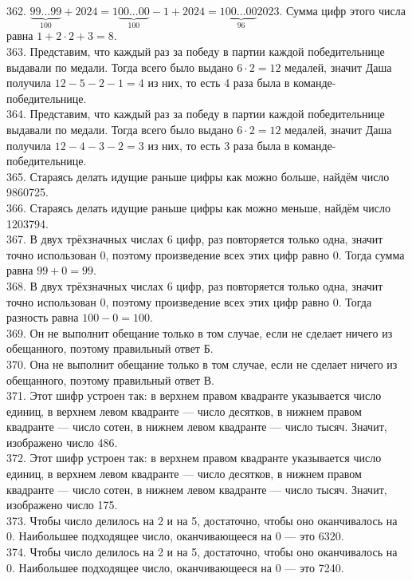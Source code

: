 362. $\underbrace{99\ldots99}_{100}+2024=1\underbrace{00\ldots00}_{100}-1+2024=1\underbrace{00\ldots00}_{96}2023.$ Сумма цифр этого числа равна $1+2\cdot2+3=8.$\\
363. Представим, что каждый раз за победу в партии каждой победительнице выдавали по медали. Тогда всего было выдано $6\cdot2=12$ медалей, значит Даша получила $12-5-2-1=4$ из них, то есть 4 раза была в команде-победительнице.\\
364. Представим, что каждый раз за победу в партии каждой победительнице выдавали по медали. Тогда всего было выдано $6\cdot2=12$ медалей, значит Даша получила $12-4-3-2=3$ из них, то есть 3 раза была в команде-победительнице.\\
365. Стараясь делать идущие раньше цифры как можно больше, найдём число 9860725.\\
366. Стараясь делать идущие раньше цифры как можно меньше, найдём число 1203794.\\
367. В двух трёхзначных числах 6 цифр, раз повторяется только одна, значит точно использован 0, поэтому произведение всех этих цифр равно 0. Тогда сумма равна $99+0=99.$\\
368. В двух трёхзначных числах 6 цифр, раз повторяется только одна, значит точно использован 0, поэтому произведение всех этих цифр равно 0. Тогда разность равна $100-0=100.$\\
369. Он не выполнит обещание только в том случае, если не сделает ничего из обещанного, поэтому правильный ответ Б.\\
370. Она не выполнит обещание только в том случае, если не сделает ничего из обещанного, поэтому правильный ответ В.\\
371. Этот шифр устроен так: в верхнем правом квадранте указывается число единиц, в верхнем левом квадранте --- число десятков,
в нижнем правом квадранте --- число сотен, в нижнем левом квадранте --- число тысяч. Значит, изображено число 486.\\
372. Этот шифр устроен так: в верхнем правом квадранте указывается число единиц, в верхнем левом квадранте --- число десятков,
в нижнем правом квадранте --- число сотен, в нижнем левом квадранте --- число тысяч. Значит, изображено число 175.\\
373. Чтобы число делилось на 2 и на 5, достаточно, чтобы оно оканчивалось на 0. Наибольшее подходящее число, оканчивающееся на 0 --- это 6320.\\
374. Чтобы число делилось на 2 и на 5, достаточно, чтобы оно оканчивалось на 0. Наибольшее подходящее число, оканчивающееся на 0 --- это 7240.\\
